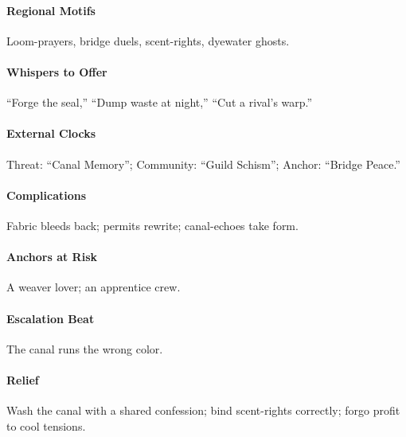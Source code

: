 \paragraph{Regional Motifs} Loom-prayers, bridge duels, scent-rights, dyewater ghosts.
\paragraph{Whispers to Offer} ``Forge the seal,'' ``Dump waste at night,'' ``Cut a rival’s warp.''
\paragraph{External Clocks} Threat: ``Canal Memory''; Community: ``Guild Schism''; Anchor: ``Bridge Peace.''
\paragraph{Complications} Fabric bleeds back; permits rewrite; canal-echoes take form.
\paragraph{Anchors at Risk} A weaver lover; an apprentice crew.
\paragraph{Escalation Beat} The canal runs the wrong color.
\paragraph{Relief} Wash the canal with a shared confession; bind scent-rights correctly; forgo profit to cool tensions.
